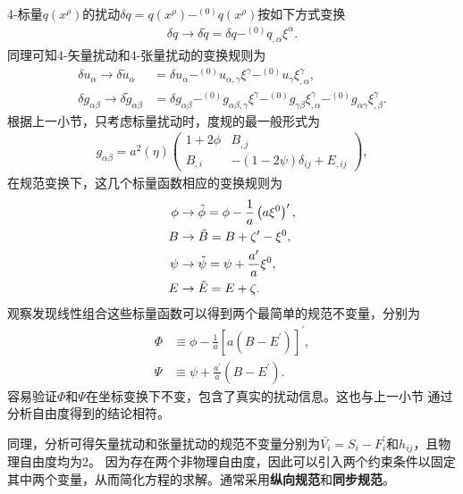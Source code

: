 4-标量$q(x^{\rho})$的扰动$\delta
	q=q(x^{\rho})-^{(0)}q(x^{\rho})$按如下方式变换
\begin{align}
	\label{eq:scalar-perturbation-transformation}
	\delta q \rightarrow \delta\tilde{q}=\delta q
	-^{(0)}q_{,\alpha}\xi^{\alpha}.
\end{align}
同理可知4-矢量扰动和4-张量扰动的变换规则为
\begin{align}
	\label{eq:vector-perturbation-transformation}
	\delta u_{\alpha} \rightarrow \delta\tilde{u}_{\alpha}          & =
	\delta
	u_{\alpha}-^{(0)}u_{\alpha,\gamma}\xi^{\gamma}-^{(0)}u_{\gamma}\xi^{\gamma}_{,\alpha},
	\\
	\label{eq:tensor-perturbation-transformation}
	\delta g_{\alpha\beta}\rightarrow\delta \tilde{g}_{\alpha\beta} & =
	\delta g_{\alpha\beta}-^{(0)}g_{\alpha\beta,\gamma}\xi^{\gamma}
	-^{(0)}g_{\gamma\beta}\xi^{\gamma}_{,\alpha}-^{(0)}g_{\alpha\gamma}\xi^{\gamma}_{,\beta}.
\end{align}
根据上一小节，只考虑标量扰动时，度规的最一般形式为
\begin{align}
	\label{eq:scalar-metric-perturbation}
	g_{\alpha\beta}=a^2(\eta)
	\begin{pmatrix}
		1 + 2\phi & B_{,j}                        \\
		B_{,i}    & -(1-2\psi)\delta_{ij}+E_{,ij}
	\end{pmatrix},
\end{align}
在规范变换下，这几个标量函数相应的变换规则为
\begin{align}
  \label{eq:transformation-for-scalar-perturbation-functions}
  \phi &\rightarrow
  \tilde{\phi}=\phi-\frac{1}{a}\left(a\xi^{0}\right)^{\prime}, \\
   B &\rightarrow \tilde{B}=B+\zeta^\prime-\xi^{0}, \\
  \psi&\rightarrow \tilde{\psi}=\psi + \frac{a^\prime}{a}\xi^{0}, \\
   E &\rightarrow \tilde{E}=E+\zeta.
\end{align}
观察发现线性组合这些标量函数可以得到两个最简单的规范不变量，分别为
\begin{align}
	\label{eq:gauge-invariant-scalar}
	\Phi & \equiv \phi
    -\frac{1}{a}{[a{\left(B-E^{\prime}\right)}]}^{\prime}, \\
	\Psi & \equiv \psi + \frac{a^{\prime}}{a}{\left(B-E^{\prime}\right)}.
\end{align}
容易验证$\Phi$和$\Psi$在坐标变换下不变，包含了真实的扰动信息。这也与上一小节
通过分析自由度得到的结论相符。

同理，分析可得矢量扰动和张量扰动的规范不变量分别为$\bar{V_{i}}=S_{i}-F^\prime_{i}$和$h_{ij}$，且物理自由度均为$2$。
因为存在两个非物理自由度，因此可以引入两个约束条件以固定其中两个变量，从而简化方程的求解。通常采用\textbf{纵向规范}和\textbf{同步规范}。

